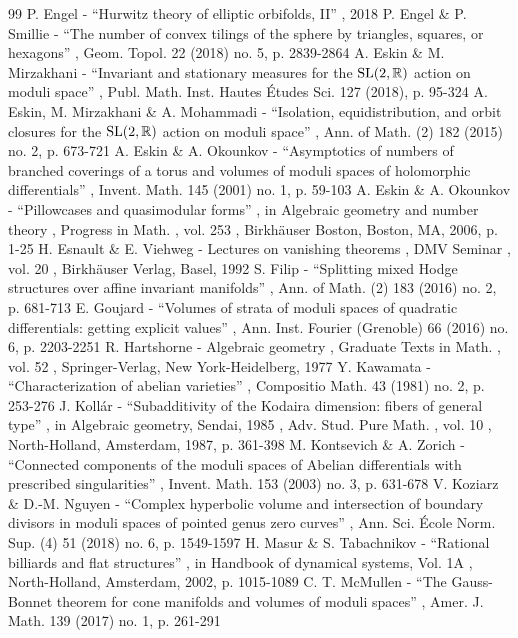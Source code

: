 \documentclass[11pt]{article}
\numberwithin{equation}{section}
\begin{document}
\begin{thebibliography}{99}
 P. Engel - “Hurwitz theory of elliptic orbifolds, II” , 2018
 P. Engel \& P. Smillie - “The number of convex tilings of the sphere by triangles, squares, or hexagons” , Geom. Topol. 22 (2018) no. 5, p. 2839-2864
 A. Eskin \& M. Mirzakhani - “Invariant and stationary measures for the ${\rm SL}(2,\mathbb{R})$ action on moduli space” , Publ. Math. Inst. Hautes Études Sci. 127 (2018), p. 95-324
 A. Eskin, M. Mirzakhani \& A. Mohammadi - “Isolation, equidistribution, and orbit closures for the ${\rm SL}(2,\mathbb{R})$ action on moduli space” , Ann. of Math. (2) 182 (2015) no. 2, p. 673-721
 A. Eskin \& A. Okounkov - “Asymptotics of numbers of branched coverings of a torus and volumes of moduli spaces of holomorphic differentials” , Invent. Math. 145 (2001) no. 1, p. 59-103
 A. Eskin \& A. Okounkov - “Pillowcases and quasimodular forms” , in Algebraic geometry and number theory , Progress in Math. , vol. 253 , Birkhäuser Boston, Boston, MA, 2006, p. 1-25
 H. Esnault \& E. Viehweg - Lectures on vanishing theorems , DMV Seminar , vol. 20 , Birkhäuser Verlag, Basel, 1992
 S. Filip - “Splitting mixed Hodge structures over affine invariant manifolds” , Ann. of Math. (2) 183 (2016) no. 2, p. 681-713
 E. Goujard - “Volumes of strata of moduli spaces of quadratic differentials: getting explicit values” , Ann. Inst. Fourier (Grenoble) 66 (2016) no. 6, p. 2203-2251
 R. Hartshorne - Algebraic geometry , Graduate Texts in Math. , vol. 52 , Springer-Verlag, New York-Heidelberg, 1977
 Y. Kawamata - “Characterization of abelian varieties” , Compositio Math. 43 (1981) no. 2, p. 253-276
 J. Kollár - “Subadditivity of the Kodaira dimension: fibers of general type” , in Algebraic geometry, Sendai, 1985 , Adv. Stud. Pure Math. , vol. 10 , North-Holland, Amsterdam, 1987, p. 361-398
 M. Kontsevich \& A. Zorich - “Connected components of the moduli spaces of Abelian differentials with prescribed singularities” , Invent. Math. 153 (2003) no. 3, p. 631-678
 V. Koziarz \& D.-M. Nguyen - “Complex hyperbolic volume and intersection of boundary divisors in moduli spaces of pointed genus zero curves” , Ann. Sci. École Norm. Sup. (4) 51 (2018) no. 6, p. 1549-1597
 H. Masur \& S. Tabachnikov - “Rational billiards and flat structures” , in Handbook of dynamical systems, Vol. 1A , North-Holland, Amsterdam, 2002, p. 1015-1089
 C. T. McMullen - “The Gauss-Bonnet theorem for cone manifolds and volumes of moduli spaces” , Amer. J. Math. 139 (2017) no. 1, p. 261-291

\end{thebibliography}
\end{document}
